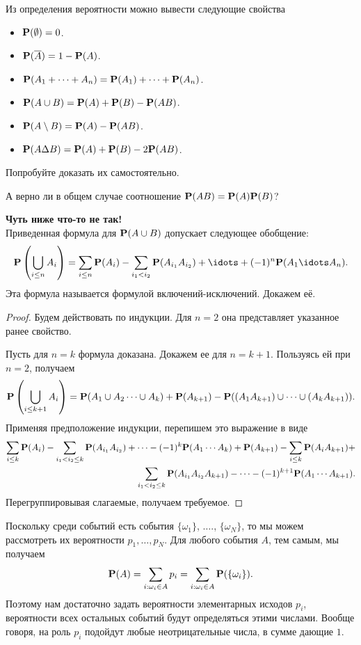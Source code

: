 \documentclass[11 pt,russian]{article}
\begin{document}
Из определения вероятности можно вывести следующие свойства
\begin{itemize}
\item ${\bf P}(\emptyset) = 0$.
\item ${\bf P}(\overline{A}) = 1 - {\bf P}(A)$.
\item ${\bf P}(A_1+ \dotsb + A_n) = {\bf P}(A_1) + \dotsb + {\bf P}(A_n)$.
\item ${\bf P}(A\cup B) = {\bf P}(A) + {\bf P}(B) - {\bf P}(AB)$.
\item ${\bf P}(A\setminus B) = {\bf P}(A) - {\bf P}(AB)$.
\item ${\bf P}(A\Delta B) = {\bf P}(A) + {\bf P}(B) - 2{\bf P}(AB)$.
\end{itemize}
Попробуйте доказать их самостоятельно. 
\begin{Que}
А верно ли в общем случае соотношение ${\bf P}(AB) = {\bf P}(A) {\bf P}(B)$?
\end{Que}
{\bf Чуть ниже что-то не так!\\ }
Приведенная формула для ${\bf P}(A\cup B)$ допускает следующее обобщение:
$$
{\bf P}\left(\bigcup_{i\le n} A_i\right) = \sum_{i\le n} {\bf P}(A_i) - \sum_{i_1< i_2} {\bf P}(A_{i_1} A_{i_2}) + \idots + (-1)^n{\bf P}(A_1 \idots A_n).
$$
Эта формула называется формулой включений-исключений. Докажем её.
\begin{proof}
Будем действовать по индукции. Для $n=2$ она представляет указанное ранее свойство.

Пусть для $n=k$ формула доказана. Докажем ее для $n=k+1$. Пользуясь ей при $n=2$, получаем
$$
{\bf P}\left(\bigcup_{i\le k+1} A_i\right) = 
{\bf P}(A_1\cup A_2 \dotsm \cup A_{k}) + {\bf P}(A_{k+1}) - {\bf P}((A_1 A_{k+1})\cup \dotsm \cup (A_{k}A_{k+1})).
$$
Применяя предположение индукции, перепишем это выражение в виде
\begin{eqnarray*}
 \sum_{i\le k} {\bf P}(A_i) - \sum_{i_1< i_2\le k} {\bf P}(A_{i_1} A_{i_2})  + \dotsb - (-1)^{k} {\bf P}(A_1 \dotsm A_{k}) + {\bf P}(A_{k+1}) - 
 \sum_{i\le k} {\bf P}(A_i A_{k+1}) +\\
  \sum_{i_1< i_2\le k} {\bf P}(A_{i_1} A_{i_2} A_{k+1})  - \dotsb - (-1)^{k+1} {\bf P}(A_1 \dotsm A_{k+1}).
\end{eqnarray*}
Перегруппировывая слагаемые, получаем требуемое.
\end{proof}
Поскольку среди событий есть события $\{\omega_1\}$, $\dotsc$., $\{\omega_N\}$, то мы можем рассмотреть их вероятности $p_1,\dotsc, p_N$. Для любого события $A$, тем самым, мы получаем
$$
{\bf P}(A) = \sum_{i: \omega_i\in A} p_i = \sum_{i: \omega_i\in A} {\bf P}(\{\omega_i\}).
$$
Поэтому нам достаточно задать вероятности элементарных исходов $p_i$, вероятности всех остальных событий будут определяться этими числами. Вообще говоря, на роль $p_i$ подойдут любые неотрицательные числа, в сумме дающие $1$.
\end{document}
